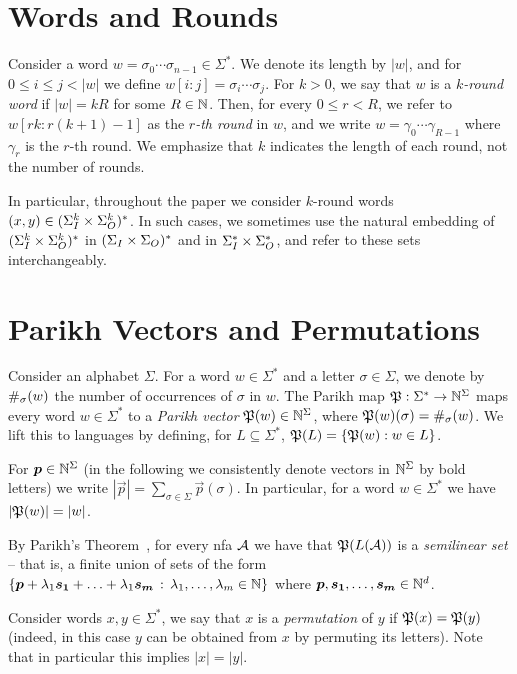 
\section*{Words and Rounds}
Consider a word $w=\sigma_0\cdots \sigma_{n-1}\in \Sigma^*$. We denote its length by $|w|$, and for $0\le i\le j< |w|$ we define $w[i:j]=\sigma_i\cdots \sigma_j$. 
For $k>0$, we say that $w$ is a \emph{$k$-round word} if $|w|=kR$ for some $R\in \mathbb{N}$. Then, for every $0\le r<R$, we refer to $w[rk:r(k+1)-1]$ as the \emph{$r$-th round} in $w$, and we write $w=\gamma_0\cdots \gamma_{R-1}$ where $\gamma_r$ is the $r$-th round. We emphasize that $k$ indicates the length of each round, not the number of rounds.

In particular, throughout the paper we consider $k$-round words $(x,y)\in (\Sigma_{I}^k\times \Sigma_{O}^k)^*$. In such cases, we sometimes use the natural embedding of $(\Sigma_{I}^k\times \Sigma_{O}^k)^*$ in $(\Sigma_{I}\times \Sigma_{O})^*$ and in $\Sigma_{I}^*\times \Sigma_{O}^*$, and refer to these sets interchangeably.

\section*{Parikh Vectors and Permutations}
Consider an alphabet $\Sigma$. For a word $w\in \Sigma^*$ and a letter $\sigma\in \Sigma$, we denote by $\#_\sigma(w)$ the number of occurrences of $\sigma$ in $w$. 
The Parikh map
$\mathfrak{P}:\Sigma^*\to \mathbb{N}^\Sigma$ maps every word $w\in \Sigma^*$ to a \emph{Parikh vector} $\mathfrak{P}(w)\in \mathbb{N}^\Sigma$, where $\mathfrak{P}(w)(\sigma)=\#_\sigma(w)$. We lift this to languages by defining, for $L\subseteq \Sigma^*$, $\mathfrak{P}(L)=\{\mathfrak{P}(w):w\in L\}$. 

For $\boldsymbol{p}\in \mathbb{N}^\Sigma$ (in the following we consistently denote vectors in $\mathbb{N}^\Sigma$ by bold letters) we write $|\vec{p}|=\sum_{\sigma\in \Sigma}\vec{p}(\sigma)$. In particular, for a word $w\in \Sigma^*$ we have $|\mathfrak{P}(w)|=|w|$.

By Parikh's Theorem~\cite{Parikh1966}, for every \gls{nfa} $\mathcal{A}$ we have that $\mathfrak{P}(L(\mathcal{A}))$ is a \emph{semilinear set} -- that is, a finite union of sets of the form $\{\boldsymbol{p}+\lambda_1 \boldsymbol{s_1}+\ldots+\lambda_1 \boldsymbol{s_m}\, :\, \lambda_1,\ldots,\lambda_m\in \mathbb{N}\}$ where $\boldsymbol{p},\boldsymbol{s_1},\ldots,\boldsymbol{s_m}\in \mathbb{N}^d$.

Consider words $x,y\in \Sigma^*$, we say that $x$ is a \emph{permutation} of $y$ if $\mathfrak{P}(x)=\mathfrak{P}(y)$ (indeed, in this case $y$ can be obtained from $x$ by permuting its letters). Note that in particular this implies $|x|=|y|$.
